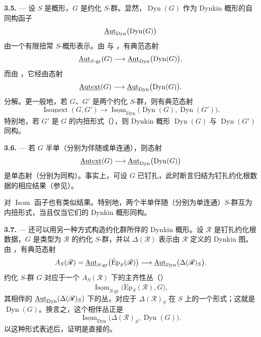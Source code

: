 \medskip\noindent\textbf{3.5.} ---
设 \(S\) 是概形，\(G\) 是约化 \(S\)-群。显然，\(\operatorname{Dyn}(G)\) 作为 Dynkin 概形的自同构函子
\[
  \underline{\operatorname{Aut}}_{\mathrm{Dyn}}
    \bigl(\operatorname{Dyn}(G)\bigr)
\]
由一个有限扭常 \(S\)-概形表示。由  与 ，有典范态射
\[
  \underline{\operatorname{Aut}}_{S\text{-}\mathrm{gr}}(G)
  \longrightarrow
  \underline{\operatorname{Aut}}_{\mathrm{Dyn}}
    \bigl(\operatorname{Dyn}(G)\bigr),
\]
而由 ，它经由态射
\[
  \underline{\operatorname{Autext}}(G)
  \longrightarrow
  \underline{\operatorname{Aut}}_{\mathrm{Dyn}}
    \bigl(\operatorname{Dyn}(G)\bigr).
\]
分解。更一般地，若 \(G\)、\(G'\) 是两个约化 \(S\)-群，则有典范态射
\[
  \underline{\operatorname{Isomext}}(G,G')
  \longrightarrow
  \underline{\operatorname{Isom}}_{\mathrm{Dyn}}
    \bigl(\operatorname{Dyn}(G),\operatorname{Dyn}(G')\bigr).
\]
特别地，若 \(G'\) 是 \(G\) 的内扭形式（），则 Dynkin 概形 \(\operatorname{Dyn}(G)\) 与 \(\operatorname{Dyn}(G')\) 同构。

\medskip\noindent\textbf{3.6.} ---
若 \(G\) 半单（分别为伴随或单连通），则态射
\[
  \underline{\operatorname{Autext}}(G)
  \longrightarrow
  \underline{\operatorname{Aut}}_{\mathrm{Dyn}}
    \bigl(\operatorname{Dyn}(G)\bigr)
\]
是单态射（分别为同构）。事实上，可设 \(G\) 已钉扎，此时断言归结为钉扎约化根数据的相应结果（参见）。

对 \(\operatorname{Isom}\) 函子也有类似结果。特别地，两个半单伴随（分别为单连通）\(S\)-群互为内扭形式，当且仅当它们的 Dynkin 概形同构。

\medskip\noindent\textbf{3.7.} ---
还可以用另一种方式构造约化群所伴的 Dynkin 概形。设 \(\mathscr R\) 是钉扎约化根数据，\(G\) 是类型为 \(\mathscr R\) 的约化 \(S\)-群，并以 \(\Delta(\mathscr R)\) 表示由 \(\mathscr R\) 定义的 Dynkin 图。由 ，有典范态射
\[
  A_S(\mathscr R)
  =
  \underline{\operatorname{Aut}}_{S\text{-}\mathrm{gr}}
    \bigl(\operatorname{\acute{E}p}_S(\mathscr R)\bigr)
  \longrightarrow
  \underline{\operatorname{Aut}}_{\mathrm{Dyn}}
    \bigl(\Delta(\mathscr R)_S\bigr).
\]
约化 \(S\)-群 \(G\) 对应于一个 \(A_S(\mathscr R)\) 下的主齐性丛（）
\[
  \underline{\operatorname{Isom}}_{S\text{-}\mathrm{gr}}
    \bigl(\operatorname{\acute{E}p}_S(\mathscr R),G\bigr),
\]
其相伴的 \(\underline{\operatorname{Aut}}_{\mathrm{Dyn}}(\Delta(\mathscr R)_S)\) 下的丛，对应于 \(\Delta(\mathscr R)_S\) 在 \(S\) 上的一个形式；这就是 \(\operatorname{Dyn}(G)\)。换言之，这个相伴丛正是
\[
  \underline{\operatorname{Isom}}_{\mathrm{Dyn}}
    \bigl(\Delta(\mathscr R)_S,\operatorname{Dyn}(G)\bigr).
\]
以这种形式表述后，证明是直接的。

